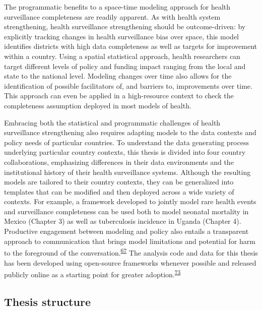 \documentclass[
]{article}
\begin{document}
The programmatic benefits to a space-time modeling approach for health surveillance completeness are readily apparent. As with health system strengthening, health surveillance strengthening should be outcome-driven: by explicitly tracking changes in health surveillance bias over space, this model identifies districts with high data completeness as well as targets for improvement within a country. Using a spatial statistical approach, health researchers can target different levels of policy and funding impact ranging from the local and state to the national level. Modeling changes over time also allows for the identification of possible facilitators of, and barriers to, improvements over time. This approach can even be applied in a high-resource context to check the completeness assumption deployed in most models of health.

Embracing both the statistical and programmatic challenges of health surveillance strengthening also requires adapting models to the data contexts and policy needs of particular countries. To understand the data generating process underlying particular country contexts, this thesis is divided into four country collaborations, emphasizing differences in their data environments and the institutional history of their health surveillance systems. Although the resulting models are tailored to their country contexts, they can be generalized into templates that can be modified and then deployed across a wide variety of contexts. For example, a framework developed to jointly model rare health events and surveillance completeness can be used both to model neonatal mortality in Mexico (Chapter 3) as well as tuberculosis incidence in Uganda (Chapter 4). Productive engagement between modeling and policy also entails a transparent approach to communication that brings model limitations and potential for harm to the foreground of the conversation.\textsuperscript{\protect\hyperlink{ref-Cinnamon2020a}{67}} The analysis code and data for this thesis has been developed using open-source frameworks whenever possible and released publicly online as a starting point for greater adoption.\textsuperscript{\protect\hyperlink{ref-Shannon2018}{73}}

\hypertarget{thesis-structure}{%
\subsection{Thesis structure}\label{thesis-structure}}
\end{document}
